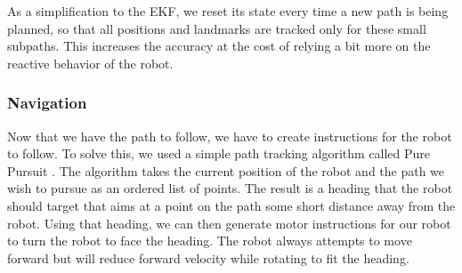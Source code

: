 As a simplification to the EKF, we reset its state every time a new path is being planned, so that all positions and landmarks are tracked only for these small subpaths. This increases the accuracy at the cost of relying a bit more on the reactive behavior of the robot.

\subsubsection{Navigation}

Now that we have the path to follow, we have to create instructions for the robot to follow. To solve this, we used a simple path tracking algorithm called Pure Pursuit \cite{Pure Pursuit}. The algorithm takes the current position of the robot and the path we wish to pursue as an ordered list of points. The result is a heading that the robot should target that aims at a point on the path some short distance away from the robot. Using that heading, we can then generate motor instructions for our robot to turn the robot to face the heading. The robot always attempts to move forward but will reduce forward velocity while rotating to fit the heading.
